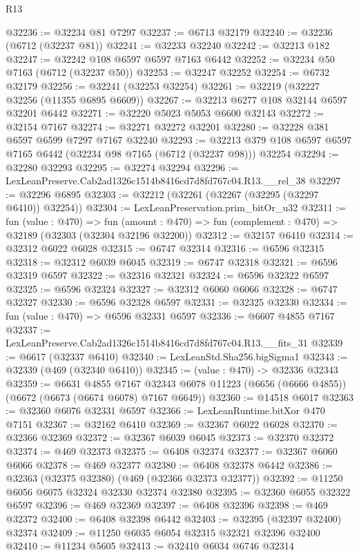 \begin{lexlean}{R13}
\begin{coremodule}
@32236 := @32234 @81 @7297
@32237 := @6713 @32179
@32240 := @32236 (@6712 (@32237 @81))
@32241 := @32233 @32240
@32242 := @32213 @182
@32247 := @32242 @108 @6597 @6597 @7163 @6442
@32252 := @32234 @50 @7163 (@6712 (@32237 @50))
@32253 := @32247 @32252
@32254 := @6732 @32179
@32256 := @32241 (@32253 @32254)
@32261 := @32219 (@32227 @32256 (@11355 @6895 @6609))
@32267 := @32213 @6277 @108 @32144 @6597 @32201 @6442
@32271 := @32220 @5023 @5053 @6600 @32143
@32272 := @32154 @7167
@32274 := @32271 @32272 @32201
@32280 := @32228 @381 @6597 @6599 @7297 @7167 @32240
@32293 := @32213 @379 @108 @6597 @6597 @7165 @6442 (@32234 @98 @7165 (@6712 (@32237 @98))) @32254
@32294 := @32280 @32293
@32295 := @32274 @32294
@32296 := LexLeanPreserve.Cab2ad1326c1514b8416cd7d8fd767c04.R13.__rel_38
@32297 := @32296 @6895
@32303 := @32212 (@32261 (@32267 (@32295 (@32297 @6410)) @32254))
@32304 := LexLeanPreservation.prim_bitOr_u32
@32311 := fun (value : @470) =>
  fun (amount : @470) => fun (complement : @470) => @32189 (@32303 (@32304 @32196 @32200))
@32312 := @32157 @6410
@32314 := @32312 @6022 @6028
@32315 := @6747 @32314
@32316 := @6596 @32315
@32318 := @32312 @6039 @6045
@32319 := @6747 @32318
@32321 := @6596 @32319 @6597
@32322 := @32316 @32321
@32324 := @6596 @32322 @6597
@32325 := @6596 @32324
@32327 := @32312 @6060 @6066
@32328 := @6747 @32327
@32330 := @6596 @32328 @6597
@32331 := @32325 @32330
@32334 := fun (value : @470) => @6596 @32331 @6597
@32336 := @6607 @4855 @7167
@32337 := LexLeanPreserve.Cab2ad1326c1514b8416cd7d8fd767c04.R13.__fits_31
@32339 := @6617 (@32337 @6410)
@32340 := LexLeanStd.Sha256.bigSigma1
@32343 := @32339 (@469 (@32340 @6410))
@32345 := (value : @470) -> @32336 @32343
@32359 := @6631
    @4855
    @7167
    @32343
    @6078
    @11223
    (@6656 (@6666 @4855))
    (@6672 (@6673 (@6674 @6078) @7167 @6649))
@32360 := @14518 @6017
@32363 := @32360 @6076 @32331 @6597
@32366 := LexLeanRuntime.bitXor @470 @7151
@32367 := @32162 @6410
@32369 := @32367 @6022 @6028
@32370 := @32366 @32369
@32372 := @32367 @6039 @6045
@32373 := @32370 @32372
@32374 := @469 @32373
@32375 := @6408 @32374
@32377 := @32367 @6060 @6066
@32378 := @469 @32377
@32380 := @6408 @32378 @6442
@32386 := @32363 (@32375 @32380) (@469 (@32366 @32373 @32377))
@32392 := @11250 @6056 @6075 @32324 @32330 @32374 @32380
@32395 := @32360 @6055 @32322 @6597
@32396 := @469 @32369
@32397 := @6408 @32396
@32398 := @469 @32372
@32400 := @6408 @32398 @6442
@32403 := @32395 (@32397 @32400) @32374
@32409 := @11250 @6035 @6054 @32315 @32321 @32396 @32400
@32410 := @11234 @5605
@32413 := @32410 @6034 @6746 @32314

\end{coremodule}
\end{lexlean}
